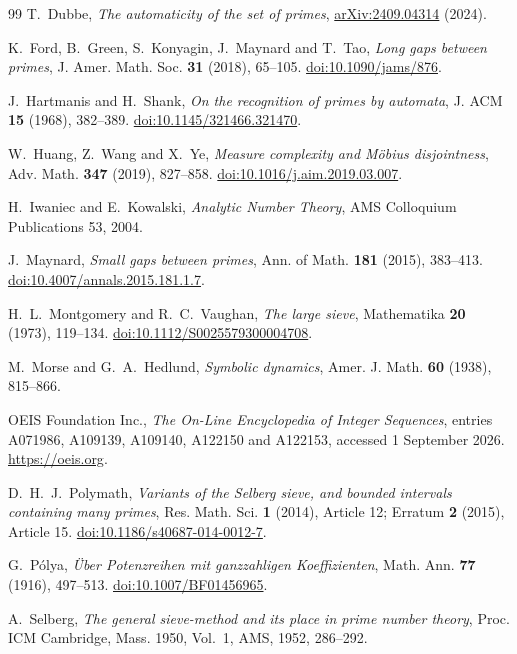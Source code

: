 \documentclass[11pt]{article}
\theoremstyle{definition}
\theoremstyle{remark}
\begin{document}
\begin{thebibliography}{99}
T.~Dubbe,
\emph{The automaticity of the set of primes},
\href{https://arxiv.org/abs/2409.04314}{arXiv:2409.04314} (2024).

K.~Ford, B.~Green, S.~Konyagin, J.~Maynard and T.~Tao,
\emph{Long gaps between primes},
J. Amer. Math. Soc. \textbf{31} (2018), 65--105.
\href{https://doi.org/10.1090/jams/876}{doi:10.1090/jams/876}.

J.~Hartmanis and H.~Shank,
\emph{On the recognition of primes by automata},
J. ACM \textbf{15} (1968), 382--389.
\href{https://doi.org/10.1145/321466.321470}{doi:10.1145/321466.321470}.

W.~Huang, Z.~Wang and X.~Ye,
\emph{Measure complexity and M\"obius disjointness},
Adv. Math. \textbf{347} (2019), 827--858.
\href{https://doi.org/10.1016/j.aim.2019.03.007}{doi:10.1016/j.aim.2019.03.007}.

H.~Iwaniec and E.~Kowalski,
\emph{Analytic Number Theory},
AMS Colloquium Publications 53, 2004.

J.~Maynard,
\emph{Small gaps between primes},
Ann. of Math. \textbf{181} (2015), 383--413.
\href{https://doi.org/10.4007/annals.2015.181.1.7}{doi:10.4007/annals.2015.181.1.7}.

H.~L.~Montgomery and R.~C.~Vaughan,
\emph{The large sieve},
Mathematika \textbf{20} (1973), 119--134.
\href{https://doi.org/10.1112/S0025579300004708}{doi:10.1112/S0025579300004708}.

M.~Morse and G.~A.~Hedlund,
\emph{Symbolic dynamics},
Amer. J. Math. \textbf{60} (1938), 815--866.

OEIS Foundation Inc.,
\emph{The On-Line Encyclopedia of Integer Sequences},
entries A071986, A109139, A109140, A122150 and A122153,
accessed 1 September 2026.
\url{https://oeis.org}.

D.~H.~J.~Polymath,
\emph{Variants of the Selberg sieve, and bounded intervals containing many primes},
Res. Math. Sci. \textbf{1} (2014), Article 12; Erratum \textbf{2} (2015), Article 15.
\href{https://doi.org/10.1186/s40687-014-0012-7}{doi:10.1186/s40687-014-0012-7}.

G.~P\'olya,
\emph{\"Uber Potenzreihen mit ganzzahligen Koeffizienten},
Math. Ann. \textbf{77} (1916), 497--513.
\href{https://doi.org/10.1007/BF01456965}{doi:10.1007/BF01456965}.

A.~Selberg,
\emph{The general sieve-method and its place in prime number theory},
Proc. ICM Cambridge, Mass. 1950, Vol.~1, AMS, 1952, 286--292.


\end{thebibliography}
\end{document}

